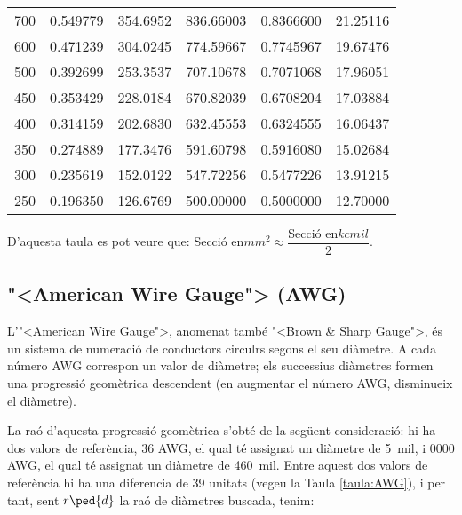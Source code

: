 \begin{longtable}{r<{\hspace{0.6em}}rrrrr}
 700 &   \num{0,549779} &   \num{354,6952}  & \num{ 836,66003} &  \num{0,8366600} &   \num{21,25116} \\
 600 &   \num{0,471239} &   \num{304,0245}  & \num{ 774,59667} &  \num{0,7745967} &   \num{19,67476} \\
 500 &   \num{0,392699} &   \num{253,3537}  & \num{ 707,10678} &  \num{0,7071068} &   \num{17,96051} \\
 450 &   \num{0,353429} &   \num{228,0184}  & \num{ 670,82039} &  \num{0,6708204} &   \num{17,03884} \\
 400 &   \num{0,314159} &   \num{202,6830}  & \num{ 632,45553} &  \num{0,6324555} &   \num{16,06437} \\
 350 &   \num{0,274889} &   \num{177,3476}  & \num{ 591,60798} &  \num{0,5916080} &   \num{15,02684} \\
 300 &   \num{0,235619} &   \num{152,0122}  & \num{ 547,72256} &  \num{0,5477226} &   \num{13,91215} \\
 250 &   \num{0,196350} &   \num{126,6769}  & \num{ 500,00000} &  \num{0,5000000} &   \num{12,70000} \\
\bottomrule[1pt]
\end{longtable}

D'aquesta taula es pot veure que: $\text{Secci\'{o} en}\unit{mm^2} \approx \dfrac{\text{Secci\'{o} en}\unit{kcmil}}{2}$.


\subsection{{"<}American Wire Gauge{">} (AWG)}\label{sec:awg}

L'{"<}American Wire Gauge{">}, anomenat tamb\'{e} {"<}Brown \& Sharp Gauge{">}, \'{e}s un sistema de numeraci\'{o} de conductors circulrs segons el seu di\`{a}metre. A cada n\'{u}mero AWG correspon un valor de di\`{a}metre; els successius di\`{a}metres formen una progressi\'{o} geom\`{e}trica descendent (en augmentar el n\'{u}mero AWG, disminueix el di\`{a}metre).

La ra\'{o} d'aquesta progressi\'{o} geom\`{e}trica s'obt\'{e} de la seg\"{u}ent consideraci\'{o}: hi ha dos valors de refer\`{e}ncia, 36 AWG, el qual t\'{e} assignat un di\`{a}metre de \SI{5}{mil}, i 0000 AWG, el qual t\'{e} assignat un di\`{a}metre de \SI{460}{mil}. Entre aquest dos valors de refer\`{e}ncia hi ha una diferencia de 39 unitats (vegeu la Taula \vref{taula:AWG}), i per tant, sent $r\ped{d}$ la ra\'{o} de di\`{a}metres buscada, tenim:

